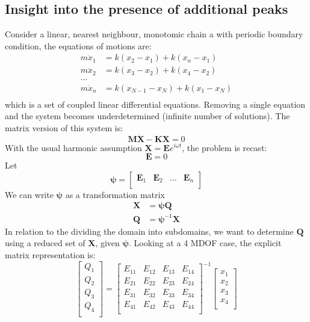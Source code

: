 \documentclass[aps,prb,preprint,preprintnumbers,amsmath,amssymb,floatfix,superscriptaddress]{revtex4}
\begin{document}
\subsection*{Insight into the presence of additional peaks}
Consider a linear, nearest neighbour, monotomic chain a with periodic boundary condition, the equations of motions are:
\begin{equation}
\begin{split}
m\ddot{x}_1&=k(x_2-x_1)+k(x_n-x_1)\\
m\ddot{x}_2&=k(x_3-x_2)+k(x_4-x_2)\\
...\\
m\ddot{x}_n&=k(x_{N-1}-x_N)+k(x_1-x_N)\\
\end{split}
\end{equation}
which is a set of coupled linear differential equations. Removing a single equation and the system becomes underdetermined (infinite number of solutions). The matrix version of this system is:
\begin{equation}
\pmb{M}\pmb{\ddot{X}}-\pmb{K}\pmb{X}=0
\end{equation}
With the usual harmonic assumption $\pmb{X}=\pmb{E}e^{i\omega t}$, the problem is recast:
\begin{equation}
[\omega^2\pmb{M}^{-1}\pmb{M}-\pmb{M}^{-1}\pmb{K}]\pmb{E}=0
\end{equation}
Let
\[
\pmb{\psi}=
\begin{bmatrix}
   \pmb{E}_1 & \pmb{E}_2 & \dots &\pmb{E}_n \\
 \end{bmatrix}
\]
We can write $\pmb{\psi}$ as a transformation matrix
\begin{equation}
\begin{split}
\pmb{X}&=\pmb{\psi}\pmb{Q}\\
\pmb{Q}&=\pmb{\psi}^{-1}\pmb{X}
\end{split}
\end{equation}
In relation to the dividing the domain into subdomains, we want to determine $\pmb{Q}$ using a reduced set of $\pmb{X}$, given $\pmb{\psi}$. Looking at a 4 MDOF case, the explicit matrix representation is:
\[
\begin{bmatrix}
   Q_1\\
   Q_2\\
   Q_3\\
   Q_4\\
\end{bmatrix}=
\begin{bmatrix}
   E_{11} & E_{12} & E_{13} & E_{14} \\
   E_{21} & E_{22} & E_{23} & E_{24} \\
   E_{31} & E_{32} & E_{33} & E_{34} \\
   E_{41} & E_{42} & E_{43} & E_{44} \\
\end{bmatrix}^{-1}
\begin{bmatrix}
   x_1\\
   x_2\\
   x_3\\
   x_4\\
\end{bmatrix}
\]
\end{document}
